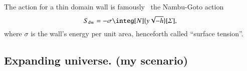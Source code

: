 The action for a thin domain wall is famously~\citep[e.g.][]{vachaspatiKinksDomainWalls2006} the Nambu-Goto action
\begin{equation}
    S\ped{dw} = -\sigma \integ[N]{y\sqrt{-h}}[\hypsurf],
\end{equation}
where $\sigma$ is the wall's energy per unit area, henceforth called ``surface tension''.











\begin{draft}
\subsection{Expanding universe. (my scenario)}




\end{draft}
